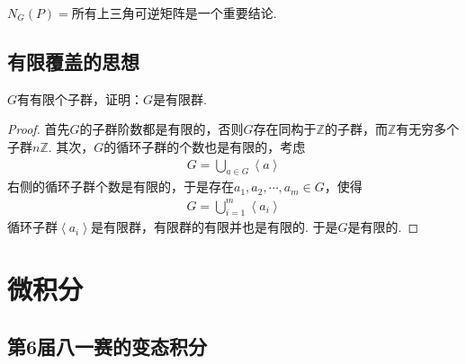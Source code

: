 \begin{note}
    $N_G(P)=$所有上三角可逆矩阵是一个重要结论.
\end{note}

\subsection{有限覆盖的思想}

\begin{exercise}
$\displaystyle G$有有限个子群，证明：$G$是有限群.
\end{exercise}

\begin{proof}
    首先$G$的子群阶数都是有限的，否则$G$存在同构于$\mathbb{Z}$的子群，而$\mathbb{Z}$有无穷多个子群$n\mathbb{Z}$. 其次，$G$的循环子群的个数也是有限的，考虑
    \begin{align}
        G=\bigcup_{a\in G}\left<a\right>
    \end{align}
    右侧的循环子群个数是有限的，于是存在$a_1,a_2,\cdots ,a_m\in G$，使得
    \begin{align}
        G=\bigcup_{i=1}^m \left<a_i\right>
    \end{align}
    循环子群$\left<a_i\right>$是有限群，有限群的有限并也是有限的. 于是$G$是有限的.
\end{proof}

\section{微积分}

\subsection{第6届八一赛的变态积分}

